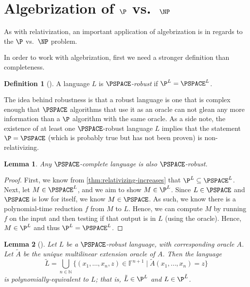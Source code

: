 \documentclass[english,12pt]{reedthesis}
\theoremstyle{plain}
\newtheorem{lemma}[lemma]{Lemma}
\theoremstyle{definition}
\newtheorem{defn}[defn]{Definition}
\theoremstyle{remark}
\begin{document}
\section{Algebrization of $\P$ vs.\ $\NP$}\label{sec:alg-p-np}

As with relativization, an important application of algebrization is in regards
to the $\P$ vs.\ $\NP$ problem.

In order to work with algebrization, first we need a stronger definition than
completeness.

\begin{defn}[{\cite[Def.\ 6.1]{BFL90}}]\label{def:pspace-robust}
  A language $L$ is \emph{$\PSPACE$-robust} if $\P^{L} = \PSPACE^{L}$.
\end{defn}

The idea behind robustness is that a robust language is one that is complex
enough that $\PSPACE$ algorithms that use it as an oracle can not glean any more
information than a $\P$ algorithm with the same oracle. As a side note, the
existence of at least one $\PSPACE$-robust language $L$ implies that the
statement $\P = \PSPACE$ (which is probably true but has not been proven) is
non-relativizing.

\begin{lemma}\label{lem:complete-is-robust}
  Any $\PSPACE$-complete language is also $\PSPACE$-robust.
\end{lemma}

\begin{proof}
  First, we know from \cref{thm:relativizing-increases} that
  $\P^{L} \subseteq \PSPACE^{L}$. Next, let $M \in \PSPACE^{L}$, and we aim to show
  $M \in \P^{L}$. Since $L \in \PSPACE$ and $\PSPACE$ is low for itself, we know
  $M \in \PSPACE$. As such, we know there is a polynomial-time reduction $f$ from
  $M$ to $L$. Hence, we can compute $M$ by running $f$ on the input and then
  testing if that output is in $L$ (using the oracle). Hence, $M \in \P^{L}$ and
  thus $\P^{L} = \PSPACE^{L}$.
\end{proof}

\begin{lemma}[{\cite[Lemma 6.2]{BFL90}}]\label{lem:multilinear-is-pspace}
  Let $L$ be a $\PSPACE$-robust language, with corresponding oracle $A$. Let
  $\tilde{A}$ be the unique multilinear extension oracle of $A$. Then the
  language
  \begin{equation}
    \tilde{L} = \bigcup_{n \in \mathbb{N}}\{(x_{1}, \ldots, x_{n}, z) \in \mathbb{F}^{n+1} \mid \tilde{A}(x_{1}, \ldots, x_{n}) = z\}
  \end{equation}
  is polynomially-equivalent to $L$; that is, $\tilde{L} \in \P^{L}$ and
  $L \in \P^{\tilde{L}}$.
\end{lemma}
\end{document}
